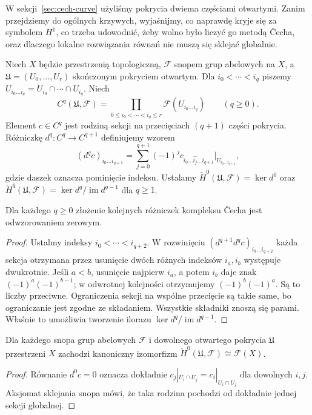 W sekcji~\ref{sec:cech-curve} użyliśmy pokrycia dwiema częściami
otwartymi. Zanim przejdziemy do ogólnych krzywych, wyjaśnijmy,
co naprawdę kryje się za symbolem $H^1$, co trzeba udowodnić,
żeby wolno było liczyć go metodą Čecha, oraz dlaczego lokalne
rozwiązania równań nie muszą się sklejać globalnie.

\begin{definicja}
Niech $X$ będzie przestrzenią topologiczną, $\mathcal F$
snopem grup abelowych na $X$, a
$\mathfrak U=(U_0,\ldots,U_r)$ skończonym pokryciem
otwartym. Dla $i_0<\cdots<i_q$ piszemy
$U_{i_0\ldots i_q}=U_{i_0}\cap\cdots\cap U_{i_q}$.
Niech
\[
 C^q(\mathfrak U,\mathcal F)
 =\prod_{0\le i_0<\cdots<i_q\le r}
       \mathcal F(U_{i_0\ldots i_q})\qquad(q\ge0).
\]
Element $c\in C^q$ jest rodziną sekcji na przecięciach
$(q+1)$ części pokrycia. Różniczkę
$d^q:C^q\to C^{q+1}$ definiujemy wzorem
\[
 (d^qc)_{i_0\ldots i_{q+1}}=
 \sum_{j=0}^{q+1}(-1)^j
 c_{i_0\ldots\widehat{i_j}\ldots i_{q+1}}
 \big|_{U_{i_0\ldots i_{q+1}}},
\]
gdzie daszek oznacza pominięcie indeksu. Ustalamy
$\check H^0(\mathfrak U,\mathcal F)=\ker d^0$ oraz
$\check H^q(\mathfrak U,\mathcal F)
=\ker d^q/\operatorname{im}d^{q-1}$ dla $q\ge1$.
\end{definicja}

\begin{lemat}[Dlaczego $d^{q+1}d^q=0$?]
Dla każdego $q\ge0$ złożenie kolejnych różniczek
kompleksu Čecha jest odwzorowaniem zerowym.
\end{lemat}
\begin{proof}
Ustalmy indeksy $i_0<\cdots<i_{q+2}$. W rozwinięciu
$(d^{q+1}d^qc)_{i_0\ldots i_{q+2}}$ każda sekcja
otrzymana przez usunięcie dwóch różnych indeksów
$i_a,i_b$ występuje dwukrotnie. Jeśli $a<b$, usunięcie
najpierw $i_a$, a potem $i_b$ daje znak
$(-1)^a(-1)^{b-1}$; w odwrotnej kolejności otrzymujemy
$(-1)^b(-1)^a$. Są to liczby przeciwne. Ograniczenia
sekcji na wspólne przecięcie są takie same, bo
ograniczanie jest zgodne ze składaniem. Wszystkie składniki
znoszą się parami. Właśnie to umożliwia tworzenie ilorazu
$\ker d^q/\operatorname{im}d^{q-1}$.
\end{proof}

\begin{stwierdzenie}
Dla każdego snopa grup abelowych $\mathcal F$ i dowolnego
otwartego pokrycia $\mathfrak U$ przestrzeni $X$ zachodzi
kanoniczny izomorfizm
$\check H^0(\mathfrak U,\mathcal F)\cong\mathcal F(X)$.
\end{stwierdzenie}
\begin{proof}
Równanie $d^0c=0$ oznacza dokładnie
$c_j|_{U_i\cap U_j}=c_i|_{U_i\cap U_j}$ dla dowolnych
$i,j$. Aksjomat sklejania snopa mówi, że taka rodzina
pochodzi od dokładnie jednej sekcji globalnej.
\end{proof}

